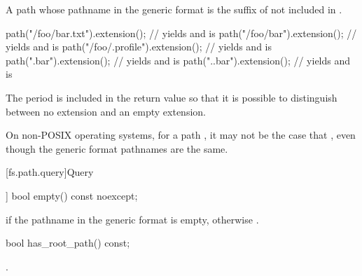 \begin{itemdescr}
\pnum
\returns
A path whose pathname in the generic format is
the suffix of  not included in .

\pnum
\begin{example}
\begin{codeblock}
path("/foo/bar.txt").extension();       // yields  and  is 
path("/foo/bar").extension();           // yields  and  is 
path("/foo/.profile").extension();      // yields  and  is 
path(".bar").extension();               // yields  and  is 
path("..bar").extension();              // yields  and  is 
\end{codeblock}
\end{example}

\pnum
\begin{note}
The period is included in the return value so that it is
  possible to distinguish between no extension and an empty extension.
\end{note}

\pnum
\begin{note}
On non-POSIX operating systems, for a path ,
it may not be the case that ,
even though the generic format pathnames are the same.
\end{note}
\end{itemdescr}

[fs.path.query]{Query}

%
\begin{itemdecl}
[[nodiscard]] bool empty() const noexcept;
\end{itemdecl}

\begin{itemdescr}
\pnum
\returns
{} if the pathname in the generic format is empty, otherwise .
\end{itemdescr}

%
\begin{itemdecl}
bool has_root_path() const;
\end{itemdecl}

\begin{itemdescr}
\pnum
\returns
{}.
\end{itemdescr}

